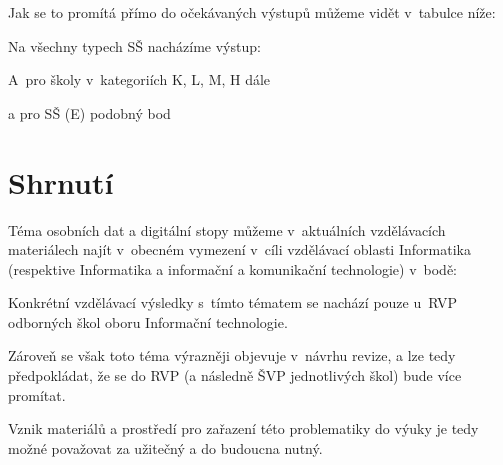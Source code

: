 Jak se to promítá přímo do očekávaných výstupů můžeme vidět v~tabulce níže:


Na všechny typech SŠ nacházíme výstup:

\begin{displayquote}
	\citep{revize}
\end{displayquote}

A~pro školy v~kategoriích K, L, M, H dále

\begin{displayquote}
	\citep{revize}
\end{displayquote}

a pro SŠ (E) podobný bod

\begin{displayquote}
	\citep{revize}
\end{displayquote}

\section*{Shrnutí}

Téma osobních dat a digitální stopy můžeme v~aktuálních vzdělávacích materiálech najít v~obecném vymezení v~cíli vzdělávací oblasti Informatika (respektive Informatika a informační a komunikační technologie) v~bodě:

\begin{displayquote}
	\citep{rvp-g}
\end{displayquote}

Konkrétní vzdělávací výsledky s~tímto tématem se nachází pouze u~RVP odborných škol oboru Informační technologie.

Zároveň se však toto téma výrazněji objevuje v~návrhu revize, a lze tedy předpokládat, že se do RVP (a následně ŠVP jednotlivých škol) bude více promítat.

Vznik materiálů a prostředí pro zařazení této problematiky do výuky je tedy možné považovat za užitečný a do budoucna nutný.
